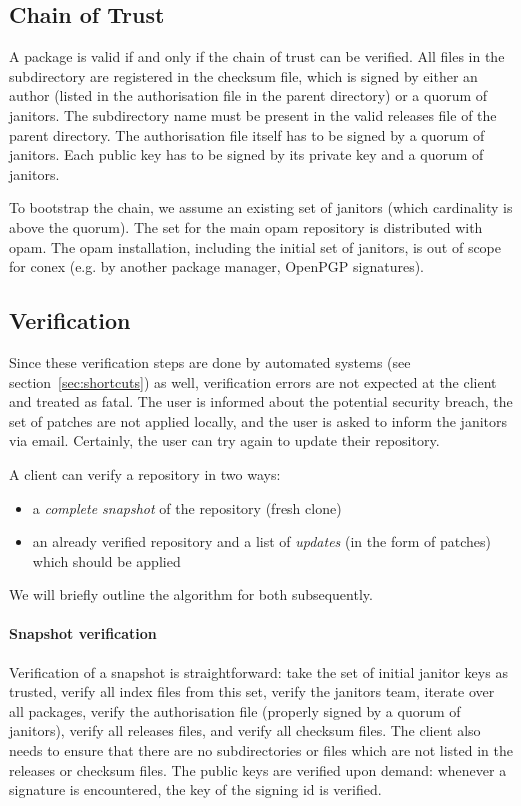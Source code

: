 \documentclass[nocopyrightspace]{sigplanconf}
\begin{document}
\subsection{Chain of Trust}
A package is valid if and only if the chain of trust can be verified.
All files in the subdirectory are registered in the checksum file, which is signed by either an author (listed in the authorisation file in the parent directory) or a quorum of janitors.
The subdirectory name must be present in the valid releases file of the parent directory.
The authorisation file itself has to be signed by a quorum of janitors.
Each public key has to be signed by its private key and a quorum of janitors.

To bootstrap the chain, we assume an existing set of janitors (which cardinality is above the quorum).
The set for the main opam repository is distributed with opam.
The opam installation, including the initial set of janitors, is out of scope for conex (e.g. by another package manager, OpenPGP signatures).

\subsection{Verification}
Since these verification steps are done by automated systems (see section~\ref{sec:shortcuts}) as well, verification errors are not expected at the client and treated as fatal.
The user is informed about the potential security breach, the set of patches are not applied locally, and the user is asked to inform the janitors via email.
Certainly, the user can try again to update their repository.

A client can verify a repository in two ways:
\begin{itemize}
  \item a \emph{complete snapshot} of the repository (fresh clone)
  \item an already verified repository and a list of \emph{updates} (in the form of patches) which should be applied
\end{itemize}

We will briefly outline the algorithm for both subsequently.

\paragraph{Snapshot verification}  Verification of a snapshot is straightforward: take the set of initial janitor keys as trusted, verify all index files from this set, verify the janitors team, iterate over all packages, verify the authorisation file (properly signed by a quorum of janitors), verify all releases files, and verify all checksum files.
The client also needs to ensure that there are no subdirectories or files which are not listed in the releases or checksum files.
The public keys are verified upon demand: whenever a signature is encountered, the key of the signing id is verified.
\end{document}
